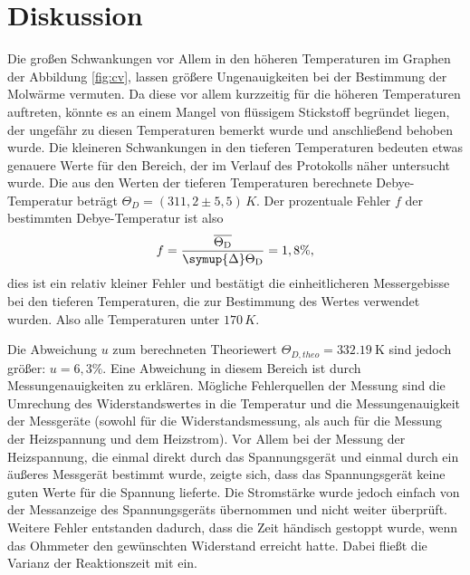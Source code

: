 \section{Diskussion}
\label{sec:Diskussion}


Die großen Schwankungen vor Allem in den höheren Temperaturen im Graphen der Abbildung \ref{fig:cv},
lassen größere Ungenauigkeiten bei der Bestimmung der Molwärme vermuten. Da diese vor allem kurzzeitig 
für die höheren Temperaturen auftreten, könnte es an einem Mangel von flüssigem Stickstoff begründet liegen, 
der ungefähr zu diesen Temperaturen bemerkt wurde und anschließend behoben wurde. Die kleineren 
Schwankungen in den tieferen Temperaturen bedeuten etwas genauere Werte für den Bereich, der 
im Verlauf des Protokolls näher untersucht wurde. Die aus den Werten der tieferen Temperaturen 
berechnete Debye-Temperatur beträgt $\Theta_{\si{D}}=(311,2 \pm 5,5) \, \si{K}$. Der prozentuale Fehler $f$ der bestimmten 
Debye-Temperatur ist also
\begin{equation*}
    f = \frac{\overline{\Theta_{\si{D}}}}{\symup{\Delta}\Theta_{\si{D}}} = 1,8 \%,
\end{equation*}
dies ist ein relativ kleiner Fehler und bestätigt die einheitlicheren Messergebisse bei den tieferen Temperaturen, 
die zur Bestimmung des Wertes verwendet wurden. Also alle Temperaturen unter $170 \, \si{K}$.

Die Abweichung $u$ zum berechneten Theoriewert $\Theta_{\si{D,theo}} = \SI{332,19}{\kelvin}$ sind jedoch 
größer: $u = 6,3 \%$. Eine Abweichung in diesem Bereich ist durch Messungenauigkeiten zu erklären. 
Mögliche Fehlerquellen der Messung sind die Umrechung des Widerstandswertes in die Temperatur und die 
Messungenauigkeit der Messgeräte (sowohl für die Widerstandsmessung, als auch für die Messung der 
Heizspannung und dem Heizstrom). Vor Allem bei der Messung der Heizspannung, die einmal direkt durch 
das Spannungsgerät und einmal durch ein äußeres Messgerät bestimmt wurde, zeigte sich, dass das 
Spannungsgerät keine guten 
Werte für die Spannung lieferte. Die Stromstärke wurde jedoch einfach von der Messanzeige des Spannungsgeräts 
übernommen und nicht weiter überprüft. Weitere Fehler entstanden dadurch, dass die Zeit händisch gestoppt 
wurde, wenn das Ohmmeter den gewünschten Widerstand erreicht hatte. Dabei fließt die Varianz der Reaktionszeit 
mit ein. 

